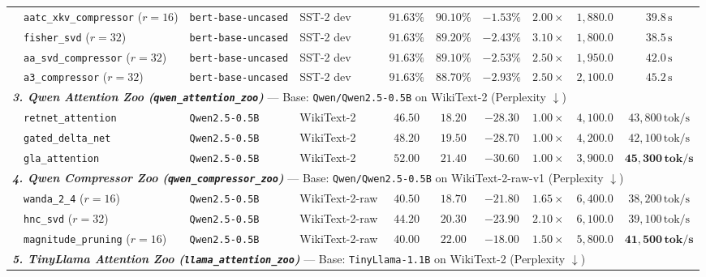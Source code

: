 \begin{table}[t]
{\begin{tabular}{l l l l c c c c c c}
& \texttt{aatc\_xkv\_compressor} ($r=16$) & \texttt{bert-base-uncased} & SST-2 dev & $91.63\%$ & $90.10\%$ & $-1.53\%$ & $2.00\times$ & $1{,}880.0$ & $39.8\,\text{s}$ \\
& \texttt{fisher\_svd} ($r=32$) & \texttt{bert-base-uncased} & SST-2 dev & $91.63\%$ & $89.20\%$ & $-2.43\%$ & $\mathbf{3.10\times}$ & $1{,}800.0$ & $38.5\,\text{s}$ \\
& \texttt{aa\_svd\_compressor} ($r=32$) & \texttt{bert-base-uncased} & SST-2 dev & $91.63\%$ & $89.10\%$ & $-2.53\%$ & $2.50\times$ & $1{,}950.0$ & $42.0\,\text{s}$ \\
& \texttt{a3\_compressor} ($r=32$) & \texttt{bert-base-uncased} & SST-2 dev & $91.63\%$ & $88.70\%$ & $-2.93\%$ & $2.50\times$ & $2{,}100.0$ & $45.2\,\text{s}$ \\
\midrule
\multicolumn{10}{l}{\textit{\textbf{3. Qwen Attention Zoo (\texttt{qwen\_attention\_zoo})}} --- Base: \texttt{Qwen/Qwen2.5-0.5B} on WikiText-2 (Perplexity $\downarrow$)} \\
& \texttt{retnet\_attention} & \texttt{Qwen2.5-0.5B} & WikiText-2 & $46.50$ & $\mathbf{18.20}$ & $-28.30$ & $1.00\times$ & $4{,}100.0$ & $43{,}800\,\text{tok/s}$ \\
& \texttt{gated\_delta\_net} & \texttt{Qwen2.5-0.5B} & WikiText-2 & $48.20$ & $19.50$ & $-28.70$ & $1.00\times$ & $4{,}200.0$ & $42{,}100\,\text{tok/s}$ \\
& \texttt{gla\_attention} & \texttt{Qwen2.5-0.5B} & WikiText-2 & $52.00$ & $21.40$ & $-30.60$ & $1.00\times$ & $3{,}900.0$ & $\mathbf{45{,}300\,\text{tok/s}}$ \\
\midrule
\multicolumn{10}{l}{\textit{\textbf{4. Qwen Compressor Zoo (\texttt{qwen\_compressor\_zoo})}} --- Base: \texttt{Qwen/Qwen2.5-0.5B} on WikiText-2-raw-v1 (Perplexity $\downarrow$)} \\
& \texttt{wanda\_2\_4} ($r=16$) & \texttt{Qwen2.5-0.5B} & WikiText-2-raw & $40.50$ & $\mathbf{18.70}$ & $-21.80$ & $1.65\times$ & $6{,}400.0$ & $38{,}200\,\text{tok/s}$ \\
& \texttt{hnc\_svd} ($r=32$) & \texttt{Qwen2.5-0.5B} & WikiText-2-raw & $44.20$ & $20.30$ & $-23.90$ & $\mathbf{2.10\times}$ & $6{,}100.0$ & $39{,}100\,\text{tok/s}$ \\
& \texttt{magnitude\_pruning} ($r=16$) & \texttt{Qwen2.5-0.5B} & WikiText-2-raw & $40.00$ & $22.00$ & $-18.00$ & $1.50\times$ & $5{,}800.0$ & $\mathbf{41{,}500\,\text{tok/s}}$ \\
\midrule
\multicolumn{10}{l}{\textit{\textbf{5. TinyLlama Attention Zoo (\texttt{llama\_attention\_zoo})}} --- Base: \texttt{TinyLlama-1.1B} on WikiText-2 (Perplexity $\downarrow$)} \\

\end{tabular}}
\end{table}

